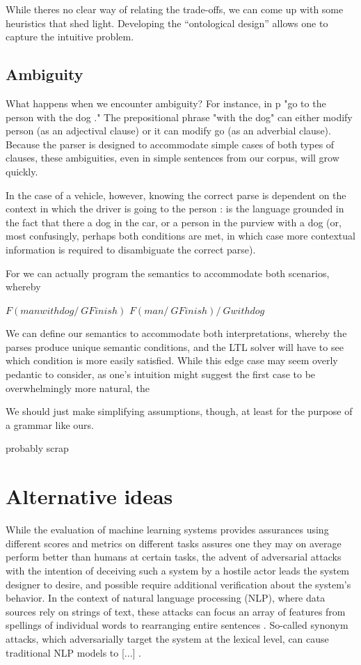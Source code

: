 \documentclass[a4paper, 11pt]{article}
\begin{document}
While theres no clear way of relating the trade-offs, we can come up with some
heuristics that shed light. Developing the ``ontological design'' allows one to
capture the intuitive problem.


\subsection{Ambiguity}

What happens when we encounter ambiguity? For instance, in p "go to the person
with the dog ." The prepositional phrase "with the dog" can either modify person
(as an adjectival clause) or it can modify go (as an adverbial clause). Because
the parser is designed to accommodate simple cases of both types of clauses,
these ambiguities, even in simple sentences from our corpus, will grow quickly. 

In the case of a vehicle, however, knowing the correct parse is dependent on
the context in which the driver is going to the person : is the language
grounded in the fact that there a dog in the car, or a person in the purview
with a dog (or, most confusingly, perhaps both conditions are met, in which case
more contextual information is required to disambiguate the correct parse).

For we can actually program the semantics to accommodate both scenarios, whereby

$F (manwithdog /\ G Finish)$
$F (man /\ G Finish) /\ G withdog$

We can define our semantics to accommodate both interpretations, whereby the
parses produce unique semantic conditions, and the LTL solver will have to see
which condition is more easily satisfied. While this edge case may seem overly
pedantic to consider, as one's intuition might suggest the first case to be
overwhelmingly more natural, the

We should just make simplifying assumptions, though, at least for the purpose of
a grammar like ours.

probably scrap
\section{Alternative ideas}

While the evaluation of machine learning systems provides assurances using
different scores and metrics on different tasks assures one they may on average
perform better than humans at certain tasks, the advent of adversarial attacks
\cite{szegedy} with the intention of deceiving such a system by a hostile actor
leads the system designer to desire, and possible require additional
verification about the system's behavior. In the context of natural language
processing (NLP), where data sources rely on strings of text, these attacks can
focus an array of features from spellings of individual words to rearranging
entire sentences \cite{}. So-called synonym attacks, which adversarially target
the system at the lexical level, can cause traditional NLP models to [...]
\cite{}.
\end{document}
